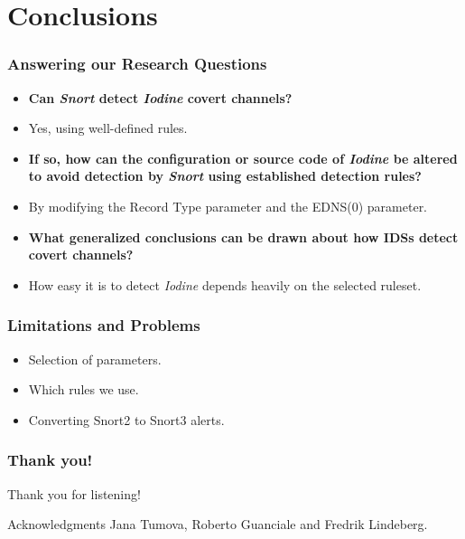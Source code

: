 \documentclass{beamer}
\begin{document}

\section{Conclusions}

\begin{frame}
\frametitle{Answering our Research Questions}
  \begin{itemize}
    \item<1-> \textbf{Can \textit{Snort} detect \textit{Iodine} covert channels?}
    \item<2-> Yes, using well-defined rules.

    \item<3-> \textbf{If so, how can the configuration or source code of \textit{Iodine} be altered to avoid detection by \textit{Snort} using established detection rules?}
    \item<4-> By modifying the Record Type parameter and the EDNS(0) parameter.

    \item<5-> \textbf{What generalized conclusions can be drawn about how IDSs detect covert channels?}
    \item<6-> How easy it is to detect \textit{Iodine} depends heavily on the selected ruleset.
  \end{itemize}
\end{frame}


\begin{frame}
\frametitle{Limitations and Problems}

\begin{itemize}
    \item<1-> Selection of parameters.
    \item<2-> Which rules we use.
    \item<3-> Converting Snort2 to Snort3 alerts.
\end{itemize}

\end{frame}


\begin{frame}
\frametitle{Thank you!}

Thank you for listening!

\begin{alertblock}{Acknowledgments}
Jana Tumova, Roberto Guanciale and Fredrik Lindeberg.
\end{alertblock}

\end{frame}
\end{document}
